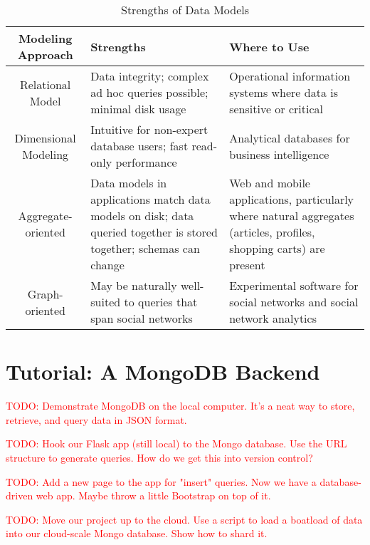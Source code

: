 \documentclass[11pt]{book}
\newcommand{\head}[1]{\textnormal{\textbf{#1}}} %
\newcommand{\todo}[1]{\textcolor{red}{TODO: #1}} %
\begin{document}
\begin{table}
\centering
\caption{Strengths of Data Models}
\vspace{10pt}
\begin{tabular}{cp{4cm}p{4cm}}
    \toprule[1.5pt]
    \head{Modeling Approach} & \head{Strengths} & \head{Where to Use} \\
    \midrule
    Relational Model & Data integrity; complex ad hoc queries possible; minimal disk usage & Operational information systems where data is sensitive or critical\\
    \midrule
    Dimensional Modeling & Intuitive for non-expert database users; fast read-only performance & Analytical databases for business intelligence\\
    \midrule
    Aggregate-oriented & Data models in applications match data models on disk; data queried together is stored together; schemas can change & Web and mobile applications, particularly where natural aggregates (articles, profiles, shopping carts) are present \\
    \midrule
    Graph-oriented & May be naturally well-suited to queries that span social networks & Experimental software for social networks and social network analytics \\
    \bottomrule[1.5pt]
\end{tabular}
\end{table}



\section{Tutorial: A MongoDB Backend}

\todo{Demonstrate MongoDB on the local computer.  It's a neat way to store, retrieve, and query data in JSON format.}

\todo{Hook our Flask app (still local) to the Mongo database. Use the URL structure to generate queries. How do we get this into version control?}

\todo{Add a new page to the app for "insert" queries.  Now we have a database-driven web app.  Maybe throw a little Bootstrap on top of it.}

\todo{Move our project up to the cloud.  Use a script to load a boatload of data into our cloud-scale Mongo database.  Show how to shard it.}
\end{document}
